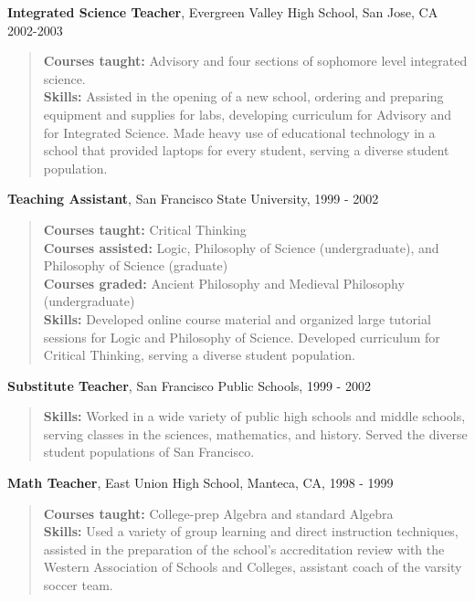 \documentclass[letterpaper]{article}
\renewenvironment{itemize}{
  \begin{list}{}{
    \setlength{\leftmargin}{1em}
  }
}{
  \end{list}
}
\begin{document}
\begin{itemize}
	\item \textbf{Integrated Science Teacher}, Evergreen Valley High School, San Jose, CA  2002-2003
\vspace{-0.5em}
\begin{quote}\textbf{Courses taught:} Advisory and four sections of sophomore level integrated science.\\  
	\textbf{Skills:} Assisted in the opening of a new school, ordering and preparing equipment and supplies for labs, developing curriculum for Advisory and for Integrated Science. Made heavy use of educational technology in a school that provided laptops for every student, serving a diverse student population.  
\end{quote}
	\item \textbf{Teaching Assistant}, San Francisco State University, 1999 - 2002 
\vspace{-0.5em}
\begin{quote}\textbf{Courses taught:} Critical Thinking  \\
	\textbf{Courses assisted:} Logic, Philosophy of Science (undergraduate), and Philosophy of Science (graduate)  \\
	\textbf{Courses graded:} Ancient Philosophy and Medieval Philosophy (undergraduate) \\  
	\textbf{Skills:} Developed online course material and organized large tutorial sessions for Logic and Philosophy of Science.  Developed curriculum for Critical Thinking, serving a diverse student population.  
\end{quote}
	\item \textbf{Substitute Teacher}, San Francisco Public Schools, 1999 - 2002 
\vspace{-0.5em}
\begin{quote}
	\textbf{Skills:} Worked in a wide variety of public high schools and middle schools, serving classes in the sciences, mathematics, and history.  Served the diverse student populations of San Francisco.  
\end{quote}
	\item \textbf{Math Teacher}, East Union High School, Manteca, CA, 1998 - 1999 
\vspace{-0.5em}
\begin{quote}\textbf{Courses taught:} College-prep Algebra and standard Algebra\\ 
	\textbf{Skills:} Used a variety of group learning and direct instruction techniques, assisted in the preparation of the school's accreditation review with the Western Association of Schools and Colleges, assistant coach of the varsity soccer team.  
\end{quote}
\end{itemize}
\end{document}
